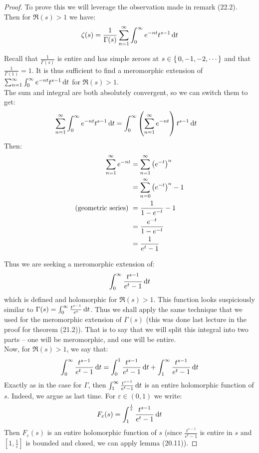 \begin{proof}
To prove this we will leverage the observation made in remark (22.2).\\

Then for $\Re(s) > 1$ we have:
\begin{align*}
    \zeta(s) = \frac{1}{\Gamma(s) } \sum_{n=1}^\infty \int_0^\infty e^{-nt} t^{s-1} \dif t
\end{align*}

Recall that $\frac{1}{\Gamma(s) }$ is entire and has simple zeroes at $s \in \set{0,-1,-2, \cdots}$ and that $\frac{1}{\Gamma(1)} = 1$. It is thus sufficient to find a meromorphic extension of $\sum_{n=1}^\infty \int_0^\infty e^{-nt} t^{s-1} \dif t$ for $\Re(s) > 1$.\\

The sum and integral are both absolutely convergent, so we can switch them to get:
\begin{align*}
    \sum_{n=1}^\infty \int_0^\infty e^{-nt} t^{s-1} \dif t &= \int_0^\infty \br{\sum_{n=1}^\infty  e^{-nt} } t^{s-1} \dif t
\end{align*}
Then:
\begin{align*}
    \sum_{n=1}^\infty  e^{-nt} &= \sum_{n=1}^\infty  \left( e^{-t} \right)^n\\
    &=\sum_{n=0}^\infty  \left( e^{-t} \right)^n - 1\\
    \text{(geometric series) }&= \frac{1}{1-e^{-t}} - 1\\
    &= \frac{e^{-t}}{1-e^{-t}}\\
    &= \frac{1}{e^t - 1}
\end{align*}


Thus we are seeking a meromorphic extension of:
\begin{align*}
    \int_0^\infty \frac{t^{s-1}}{e^t - 1}  \dif t
\end{align*}
which is defined and holomorphic for $\Re(s) > 1$. This function looks suspiciously similar to $\Gamma(s) = \int_0^\infty \frac{t^{s-1}}{e^t }  \dif t$. Thus we shall apply the same technique that we used for the meromorphic extension of $\Gamma(s)$ (this was done last lecture in the proof for theorem (21.2)). That is to say that we will split this integral into two parts -- one will be meromorphic, and one will be entire.\\

Now, for $\Re(s) > 1$, we say that:
\begin{align*}
    \int_0^\infty \frac{t^{s-1}}{e^t - 1}  \dif t =     \int_0^1 \frac{t^{s-1}}{e^t - 1}  \dif t +     \int_1^\infty \frac{t^{s-1}}{e^t - 1}  \dif t
\end{align*}
Exactly as in the case for $\Gamma$, then $\int_1^\infty \frac{t^{s-1}}{e^t - 1}  \dif t$ is an entire holomorphic function of $s$. Indeed, we argue as last time. For $\varepsilon \in (0,1)$ we write:
\begin{align*}
    F_\varepsilon (s) = \int_1^{\frac{1}{\varepsilon}} \frac{t^{s-1}}{e^t-1} \dif t
\end{align*}
Then $F_\varepsilon(s) $ is an entire holomorphic function of $s$ (since $\frac{t^{s-1}}{e^t - 1}$ is entire in $s$ and $[1, \frac{1}{\varepsilon}]$ is bounded and closed, we can apply lemma (20.11)).



\end{proof}
